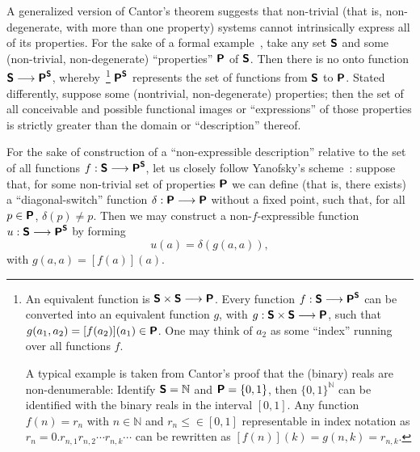 A generalized version of Cantor's theorem suggests that non-trivial
(that is, non-degenerate, with more than one property)
systems cannot intrinsically express all of its properties.
For the sake of a formal example~\cite[p.~363]{Yanofsky-BSL:9051621},
take any set $\textsf{\textbf{S}}$ and some (non-trivial, non-degenerate) ``properties'' $\textsf{\textbf{P}}$ of $\textsf{\textbf{S}}$.
Then there is no onto function $\textsf{\textbf{S}} \longrightarrow \textsf{\textbf{P}}^\textsf{\textbf{S}}$,
whereby~\footnote{An equivalent function is $\textsf{\textbf{S}} \times \textsf{\textbf{S}} \longrightarrow \textsf{\textbf{P}}$.
Every function
$f: \textsf{\textbf{S}} \longrightarrow \textsf{\textbf{P}}^\textsf{\textbf{S}}$
can be converted into an equivalent function $g$,
with
$g: \textsf{\textbf{S}} \times \textsf{\textbf{S}} \longrightarrow \textsf{\textbf{P}}$,
such that $g(a_1,a_2) = [f (a_2)](a_1) \in \textsf{\textbf{P}}$.
One may think of
$a_2$ as some ``index'' running over all functions $f$.

A typical example is taken from Cantor's proof that the (binary) reals are non-denumerable:
Identify $\textsf{\textbf{S}}= {\mathbb N}$ and $\textsf{\textbf{P}}=\{0,1\}$, then $\{0,1\}^{\mathbb N}$ can be identified with the
binary reals in the interval $[0,1]$.
Any function $f(n) =  r_n$ with $n \in {\mathbb N}$ and $r_n \le \in [0,1]$
representable in index notation as $r_n=0.r_{n,1}r_{n,2}\cdots r_{n,k} \cdots $
can be rewritten as $[f(n)](k) = g(n,k) = r_{n,k}$.
}
$\textsf{\textbf{P}}^\textsf{\textbf{S}}$ represents the set of functions from $\textsf{\textbf{S}}$ to $\textsf{\textbf{P}}$.
Stated differently, suppose some (nontrivial, non-degenerate) properties; then
the set of all conceivable and possible functional images or ``expressions'' of those properties
is strictly greater than the domain or ``description'' thereof.

For the sake of construction of a ``non-expressible description'' relative to the set of
all functions $f: \textsf{\textbf{S}} \longrightarrow \textsf{\textbf{P}}^\textsf{\textbf{S}}$,
let us closely follow Yanofsky's scheme~\cite{Yanofsky-BSL:9051621}:
suppose that, for some non-trivial set of properties $\textsf{\textbf{P}}$ we can define (that is, there exists)
a ``diagonal-switch'' function
$\delta: \textsf{\textbf{P}} \longrightarrow \textsf{\textbf{P}}$
without a fixed point,
such that, for all $p\in \textsf{\textbf{P}}$, $\delta (p)\neq p$.
Then we may construct a non-$f$-expressible function $u: \textsf{\textbf{S}} \longrightarrow \textsf{\textbf{P}}^\textsf{\textbf{S}}$ by forming
\begin{equation}
u(a) = \delta(g(a,a)),
\end{equation}
with $g(a,a) = [f(a)](a)$.

